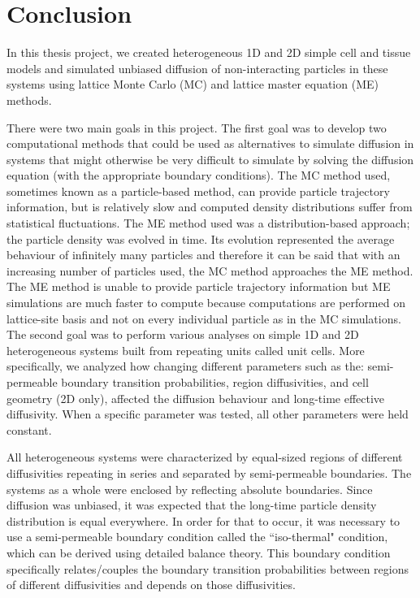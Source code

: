 \chapter{Conclusion}
	
	In this thesis project, we created heterogeneous 1D and 2D simple cell and tissue models and simulated unbiased diffusion of non-interacting particles in these systems using lattice Monte Carlo (MC) and lattice master equation (ME) methods. 
	
	There were two main goals in this project. The first goal was to develop two computational methods that could be used as alternatives to simulate diffusion in systems that might otherwise be very difficult to simulate by solving the diffusion equation (with the appropriate boundary conditions). The MC method used, sometimes known as a particle-based method, can provide particle trajectory information, but is relatively slow and computed density distributions suffer from statistical fluctuations. The ME method used was a distribution-based approach; the particle density was evolved in time. Its evolution represented the average behaviour of infinitely many particles and therefore it can be said that with an increasing number of particles used, the MC method approaches the ME method. The ME method is unable to provide particle trajectory information but ME simulations are much faster to compute because computations are performed on lattice-site basis and not on every individual particle as in the MC simulations. The second goal was to perform various analyses on simple 1D and 2D heterogeneous systems built from repeating units called unit cells. More specifically, we analyzed how changing different parameters such as the: semi-permeable boundary transition probabilities, region diffusivities, and cell geometry (2D only), affected the diffusion behaviour and long-time effective diffusivity. When a specific parameter was tested, all other parameters were held constant.
	
	\newpage
	
	All heterogeneous systems were characterized by equal-sized regions of different diffusivities repeating in series and separated by semi-permeable boundaries. The systems as a whole were enclosed by reflecting absolute boundaries. Since diffusion was unbiased, it was expected that the long-time particle density distribution is equal everywhere. In order for that to occur, it was necessary to use a semi-permeable boundary condition called the ``iso-thermal" condition, which can be derived using detailed balance theory. This boundary condition specifically relates/couples the boundary transition probabilities between regions of different diffusivities and depends on those diffusivities.
	
